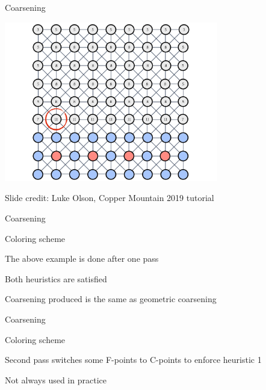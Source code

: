 \documentclass[18pt,xcolor=table]{beamer}
\begin{document}
\begin{frame}{Coarsening}
{\begin{center}
\includegraphics[width=0.7\textwidth]{../figures/amgCoarsening-10}
\end{center}}
\tiny{Slide credit: Luke Olson, Copper Mountain 2019 tutorial}
\end{frame}

\begin{frame}{Coarsening}
\begin{block}{Coloring scheme}
\bit
\item The above example is done after one pass
\item Both heuristics are satisfied
\item Coarsening produced is the same as geometric coarsening
\eit
\end{block}
\end{frame}

\begin{frame}{Coarsening}
\begin{block}{Coloring scheme}
\bit
\item Second pass switches some F-points to C-points to enforce heuristic 1
\item Not always used in practice
\eit
\end{block}
\end{frame}
\end{document}
